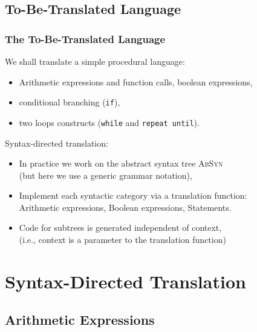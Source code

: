 \documentclass{beamer}
\newcommand{\codesize}{\footnotesize}
\newcommand{\cd}[1]{{{\codesize\tt #1}}}
\renewcommand{\emph}[1]{\textcolor{structure}{#1}}
\newcommand{\emp}[1]{\textcolor{DikuRed}{ #1}}
\begin{document}
\subsection{To-Be-Translated Language}


\begin{frame}[fragile]
	\frametitle{The To-Be-Translated Language}
	
We shall translate a simple procedural language:
\begin{itemize}
\item Arithmetic expressions and function calls, boolean expressions,\smallskip
\item conditional branching (\cd{if}), \smallskip
\item two loops constructs (\cd{while} and \cd{repeat until}).\bigskip
\end{itemize}

\emph{Syntax-directed} translation:\smallskip
\begin{itemize}
\item In practice we work on the abstract syntax tree \textsc{AbSyn}\\
        (but here we use a generic grammar notation),\smallskip

\item Implement each \emph{syntactic category} via a \emp{translation function}:\\
    \emph{Arithmetic expressions, Boolean expressions, Statements.}


\item Code for subtrees is generated \emph{independent of context},\\
        (i.e., context is a parameter to the translation function)
\end{itemize}

\end{frame}


\section{Syntax-Directed Translation}

\subsection{Arithmetic Expressions}

\begin{frame}
	\tableofcontents[currentsubsection]
\end{frame}
\end{document}
